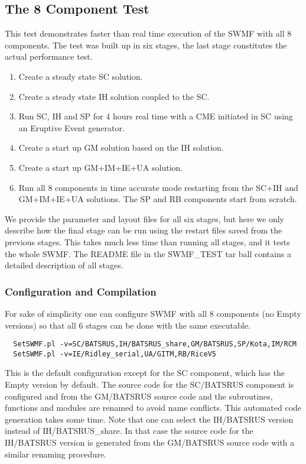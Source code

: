 \documentclass[twoside,10pt]{article}
\begin{document}
\subsection{The 8 Component Test}

This test demonstrates faster than real time execution of the
SWMF with all 8 components. The test was built up in six stages,
the last stage constitutes the actual performance test.
\begin{enumerate}
\item Create a steady state SC solution.
\item Create a steady state IH solution coupled to the SC.
\item Run SC, IH and SP for 4 hours real time with 
      a CME initiated in SC using an Eruptive Event generator.
\item Create a start up GM solution based on the IH solution.
\item Create a start up GM+IM+IE+UA solution.
\item Run all 8 components in time accurate mode restarting from the
      SC+IH and GM+IM+IE+UA solutions. 
      The SP and RB components start from scratch.
\end{enumerate}
We provide the parameter and layout files for all six stages,
but here we only describe how the final stage can be run using
the restart files saved from the previous stages.
This takes much less time than running all stages, 
and it tests the whole SWMF. The README file in the SWMF\_TEST
tar ball contains a detailed description of all stages.

\subsubsection{Configuration and Compilation}

For sake of simplicity one can configure SWMF with all 8 components
(no Empty versions) so that all 6 stages can be done with the same
executable. 
\begin{verbatim}
  SetSWMF.pl -v=SC/BATSRUS,IH/BATSRUS_share,GM/BATSRUS,SP/Kota,IM/RCM
  SetSWMF.pl -v=IE/Ridley_serial,UA/GITM,RB/RiceV5
\end{verbatim}
This is the default configuration except for the SC
component, which has the Empty version by default.
The source code for the SC/BATSRUS component is configured and 
from the GM/BATSRUS source code and the subroutines, functions and 
modules are renamed to avoid name conflicts. This automated code
generation takes some time.
Note that one can select the IH/BATSRUS version instead of IH/BATSRUS\_share.
In that case the source code for the IH/BATSRUS version is generated 
from the GM/BATSRUS source code with a similar renaming procedure.
\end{document}
